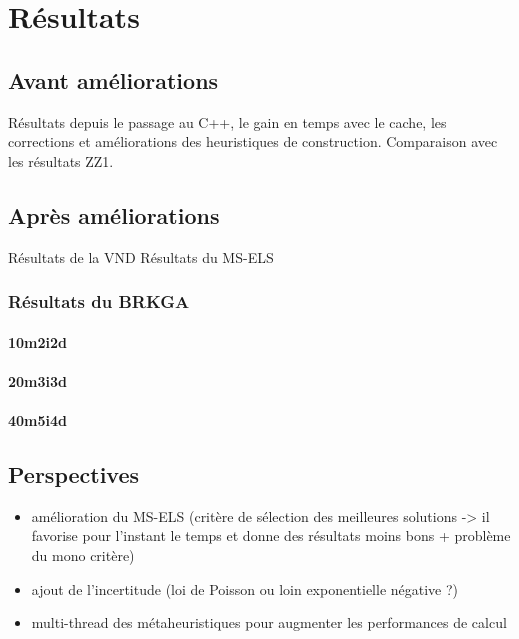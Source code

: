 \chapter{Résultats}
    \section{Avant améliorations}
    	Résultats depuis le passage au C++, le gain en temps avec le cache, les corrections et améliorations des heuristiques de construction.
    	Comparaison avec les résultats ZZ1.
    \section{Après améliorations}
    	Résultats de la VND
    	Résultats du MS-ELS
    	\subsection{Résultats du BRKGA}
            \subsubsection{10m2i2d}
                
                
                
            \subsubsection{20m3i3d}
                
                
                
                
            \subsubsection{40m5i4d}
                
                
                


    \section{Perspectives}
    
    	\begin{itemize}
    		\item amélioration du MS-ELS (critère de sélection des meilleures solutions -> il favorise pour l'instant le temps et donne des résultats moins bons + problème du mono critère)
    		\item ajout de l'incertitude (loi de Poisson ou loin exponentielle négative ?)
    		\item multi-thread des métaheuristiques pour augmenter les performances de calcul
    	\end{itemize}
    		
